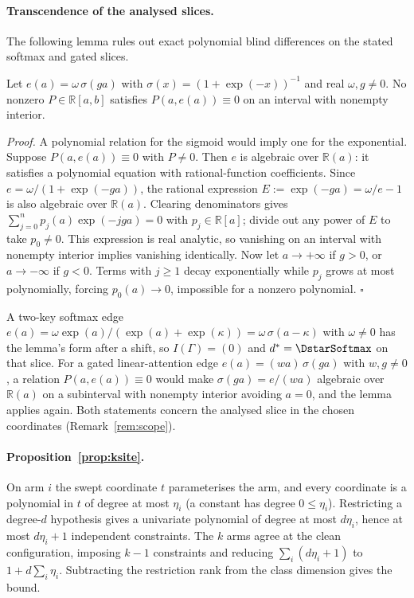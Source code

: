 \paragraph{Transcendence of the analysed slices.}
The following lemma rules out exact polynomial blind differences on the stated softmax and gated slices.
\begin{lemma}
Let $e(a)=\omega\,\sigma(ga)$ with $\sigma(x)=(1+\exp(-x))^{-1}$ and real $\omega,g\neq0$. No nonzero $P\in\mathbb
R[a,b]$ satisfies $P(a,e(a))\equiv0$ on an interval with nonempty interior.
\end{lemma}
\emph{Proof.} A polynomial relation for the sigmoid would imply one for the exponential.
Suppose $P(a,e(a))\equiv0$ with $P\neq0$. Then $e$ is algebraic over $\mathbb R(a)$: it satisfies a polynomial
equation with rational-function coefficients. Since $e=\omega/(1+\exp(-ga))$, the rational expression
$E:=\exp(-ga)=\omega/e-1$ is also algebraic over $\mathbb R(a)$. Clearing denominators gives
$\sum_{j=0}^np_j(a)\exp(-jga)=0$ with $p_j\in\mathbb R[a]$; divide out any power of $E$ to take $p_0\neq0$.
This expression is real analytic, so vanishing on an interval with nonempty interior implies vanishing identically.
Now let $a\to+\infty$ if $g>0$, or $a\to-\infty$ if $g<0$. Terms with $j\ge1$ decay exponentially while $p_j$
grows at most polynomially, forcing $p_0(a)\to0$, impossible for a nonzero polynomial. $\square$

A two-key softmax edge $e(a)=\omega\exp(a)/(\exp(a)+\exp(\kappa))=\omega\,\sigma(a-\kappa)$ with $\omega\neq0$ has the
lemma's form after a shift, so $I(\Gamma)=(0)$ and $d^*=\DstarSoftmax$ on that slice. For a gated linear-attention edge
$e(a)=(wa)\,\sigma(ga)$ with $w,g\neq0$, a relation $P(a,e(a))\equiv0$ would make $\sigma(ga)=e/(wa)$ algebraic over
$\mathbb R(a)$ on a subinterval with nonempty interior avoiding $a=0$, and the lemma applies again. Both statements concern the analysed slice
in the chosen coordinates (Remark~\ref{rem:scope}).

\paragraph{Proposition~\ref{prop:ksite}.} On arm $i$ the swept coordinate $t$ parameterises the arm, and every
coordinate is a polynomial in $t$ of degree at most $\eta_i$ (a constant has degree $0\le\eta_i$). Restricting a
degree-$d$ hypothesis gives a univariate polynomial of degree at most $d\eta_i$, hence at most $d\eta_i+1$
independent constraints. The $k$ arms agree at the clean configuration, imposing $k-1$ constraints and reducing
$\sum_i(d\eta_i+1)$ to $1+d\sum_i\eta_i$. Subtracting the restriction rank from the class dimension gives the bound.

